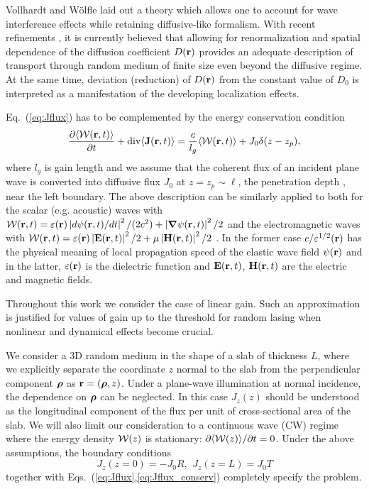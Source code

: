 Vollhardt and W\"{o}lfle \cite{1980_Vollhardt_Wolfle} laid out a theory which allows one to account for wave interference effects while retaining diffusive-like formalism. With recent refinements \cite{2008_Cherroret,2010_Payne_PRL}, it is currently believed that allowing for renormalization and spatial dependence of the diffusion coefficient $D({\bf r})$ provides an adequate description of transport through random medium of finite size even beyond the diffusive regime. At the same time, deviation (reduction) of $D({\bf r})$ from the constant value of $D_0$ is interpreted as a manifestation of the developing localization effects.

Eq.~(\ref{eq:Jflux}) has to be complemented by the energy conservation condition
\begin{equation}
\frac{\partial \langle {\cal W}({\bf r},t)\rangle }{\partial t}+{\rm div}\langle{\bf J}({\bf r},t)\rangle=
\frac{c}{l_g}\langle {\cal W}({\bf r},t)\rangle+J_0 \delta(z-z_p),
\label{eq:Jflux_conserv}
\end{equation}
where $l_g$ is gain length and we assume that the coherent flux of an incident plane wave is converted into diffusive flux $J_0$ at $z=z_p\sim\ell$, the penetration depth \cite{1993_Lisyansky_diffusint}, near the left boundary. The above description can be similarly applied to both for the scalar (e.g. acoustic) waves with ${\cal W}({\bf r},t)=\varepsilon({\bf r})\left|d\psi({\bf r},t)/dt\right|^2/(2c^2)+\left|\mbox{\boldmath$\nabla$} \psi({\bf r},t)\right|^2/2$ and the electromagnetic waves with ${\cal W}({\bf r},t)=\varepsilon({\bf r})\left|{\bf E}({\bf r},t)\right|^2/2+\mu\left|{\bf H}({\bf r},t)\right|^2/2$ \cite{1953_Morse}. In the former case $c/\varepsilon^{1/2}({\bf r})$ has the physical meaning of local propagation speed of the elastic wave field $\psi({\bf r})$ and in the latter, $\varepsilon({\bf r})$ is the dielectric function and ${\bf E}({\bf r},t)$, ${\bf H}({\bf r},t)$ are the electric and magnetic fields. 

Throughout this work we consider the case of linear gain. Such an approximation is justified for values of gain up to the threshold for random lasing when nonlinear and dynamical effects\cite{2005_Cao,2009_Deych_random_laser_theory,2008_Stone,2008_Conti_opals,2009_Frank} become crucial.

We consider a 3D random medium in the shape of a slab of thickness $L$, where we explicitly  separate the coordinate $z$ normal to the slab from the perpendicular component ${\mbox{\boldmath$\rho$}}$ as ${\bf r}=({\mbox{\boldmath$\rho$}},z)$. Under a plane-wave illumination at normal incidence, the dependence on ${\mbox{\boldmath$\rho$}}$ can be neglected. In this case $J_z(z)$ should be understood as the longitudinal component of the flux per unit of cross-sectional area of the slab.  We will also limit our consideration to a continuous wave (CW) regime where the energy density ${\cal W}(z)$ is stationary: $\partial \langle {\cal W}(z)\rangle/\partial t=0$. Under the above assumptions, the boundary conditions 
\begin{equation}
J_z(z=0)=-J_0R,\ \, J_z(z=L)=J_0T
\label{eq:Jflux_bc}
\end{equation}
together with Eqs.~(\ref{eq:Jflux},\ref{eq:Jflux_conserv}) completely specify the problem.

